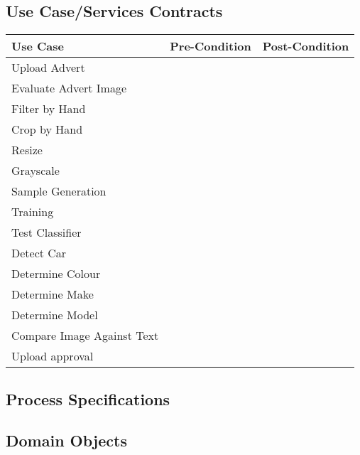 \subsection{Use Case/Services Contracts}
\begin{tabular}{l | l | l}
	Use Case & Pre-Condition & Post-Condition \\
	\hline
	Upload Advert && \\
	Evaluate Advert Image && \\
	
	Filter by Hand && \\
	Crop by Hand && \\
	Resize && \\
	Grayscale && \\
		
	Sample Generation && \\
	Training && \\
	Test Classifier && \\
		
	Detect Car && \\
	Determine Colour && \\
	Determine Make &&  \\
	Determine Model && \\
		
	Compare Image Against Text && \\
	Upload approval && \\
\end{tabular}

\subsection{Process Specifications}

\subsection{Domain Objects}
